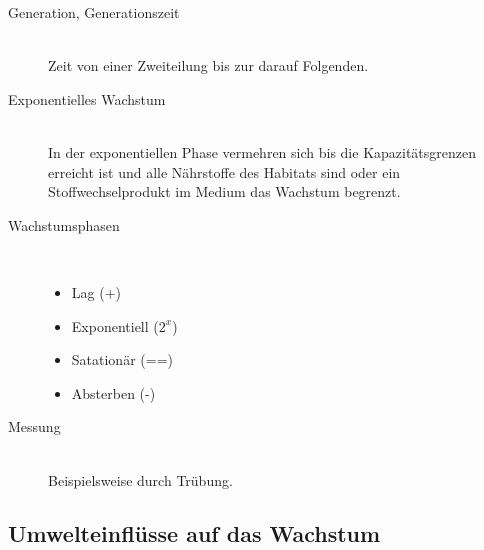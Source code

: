 \begin{description}
	\item[Generation, Generationszeit] \hfill \\
		Zeit von einer Zweiteilung bis zur darauf Folgenden.

	\item[Exponentielles Wachstum] \hfill \\
		In der exponentiellen Phase vermehren sich bis die 
		Kapazitätsgrenzen erreicht ist und alle Nährstoffe des Habitats sind
		oder ein Stoffwechselprodukt im Medium das Wachstum begrenzt.

	\item[Wachstumsphasen] \hfill \\
		\begin{itemize}
			\item Lag	(+)
			\item Exponentiell	($2^x$)
			\item Satationär	(==)
			\item Absterben	(-)
		\end{itemize}

	\item[Messung] \hfill \\
		Beispielsweise durch Trübung.

\end{description}

\subsection{Umwelteinflüsse auf das Wachstum}
